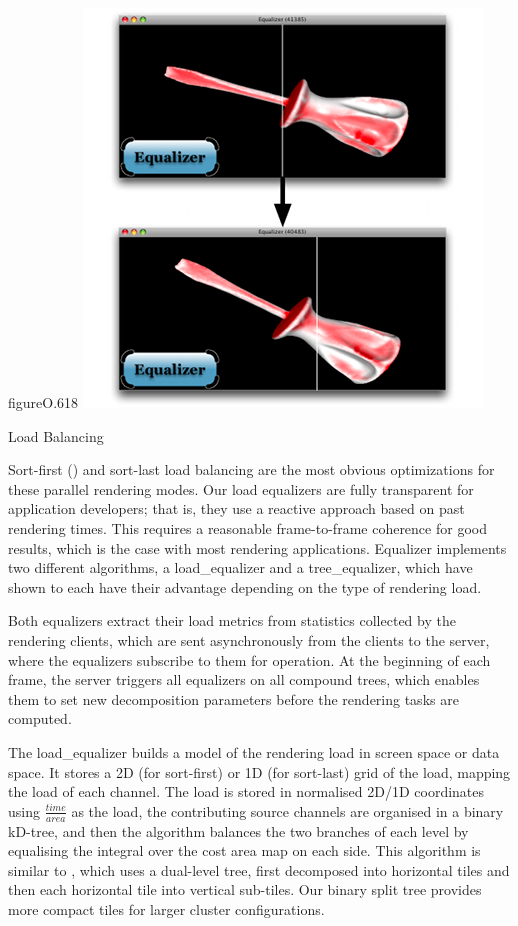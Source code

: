 \begin{wrapfloat}{figure}{O}{.618\textwidth}
  \includegraphics[width=.618\textwidth]{images/loadeq}
  \caption{\label{floadeq}Load Balancing}
\end{wrapfloat}

Sort-first () and sort-last load balancing are the most obvious
optimizations for these parallel rendering modes. Our load equalizers are fully
transparent for application developers; that is, they use a reactive approach
based on past rendering times. This requires a reasonable frame-to-frame
coherence for good results, which is the case with most rendering applications.
Equalizer implements two different algorithms, a \textsf{load\_equalizer} and a
\textsf{tree\_equalizer}, which have shown to each have their advantage
depending on the type of rendering load.

Both equalizers extract their load metrics from statistics collected by the
rendering clients, which are sent asynchronously from the clients to the
server, where the equalizers subscribe to them for operation. At the beginning
of each frame, the server triggers all equalizers on all compound trees, which
enables them to set new decomposition parameters before the rendering tasks are
computed.

The \textsf{load\_equalizer} builds a model of the rendering load in screen
space or data space. It stores a 2D (for sort-first) or 1D (for sort-last) grid
of the load, mapping the load of each channel. The load is stored in normalised
2D/1D coordinates using $\frac{time}{area}$ as the load, the contributing source
channels are organised in a binary kD-tree, and then the algorithm balances the
two branches of each level by equalising the integral over the cost area map on
each side. This algorithm is similar to \cite{ACCC:04}, which uses a dual-level
tree, first decomposed into horizontal tiles and then each horizontal tile into
vertical sub-tiles. Our binary split tree provides more compact tiles for larger
cluster configurations.

